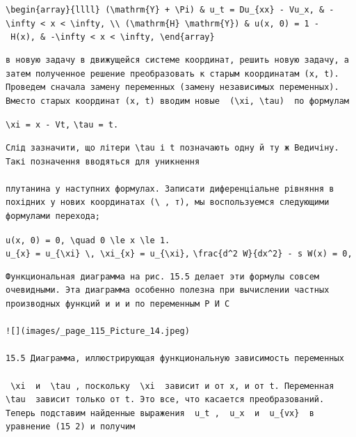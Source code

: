 \documentclass[
  ukrainian,
]{article}
\begin{document}
\texttt{\textbackslash{}begin\{array\}\{llll\}\ (\textbackslash{}mathrm\{Y\}\ +\ \textbackslash{}Pi)\ \&\ u\_t\ =\ Du\_\{xx\}\ -\ Vu\_x,\ \&\ -\textbackslash{}infty\ \textless{}\ x\ \textless{}\ \textbackslash{}infty,\ \textbackslash{}\textbackslash{}\ (\textbackslash{}mathrm\{H\}\ \textbackslash{}mathrm\{Y\})\ \&\ u(x,\ 0)\ =\ 1\ -\ H(x),\ \&\ -\textbackslash{}infty\ \textless{}\ x\ \textless{}\ \textbackslash{}infty,\ \textbackslash{}end\{array\}}

\begin{verbatim}
в новую задачу в движущейся системе координат, решить новую задачу, а затем полученное решение преобразовать к старым координатам (x, t). Проведем сначала замену переменных (замену независимых переменных). Вместо старых координат (x, t) вводим новые  (\xi, \tau)  по формулам
\end{verbatim}

\texttt{\textbackslash{}xi\ =\ x\ -\ Vt,}
\texttt{\textbackslash{}tau\ =\ t.}

\begin{verbatim}
Слід зазначити, що літери \tau і t позначають одну й ту ж Ведичіну. Такі позначення вводяться для уникнення

плутанина у наступних формулах. Записати диференціальне рівняння в похідних у нових координатах (\ , т), мы воспользуемся следующими формулами перехода;
\end{verbatim}

\texttt{u(x,\ 0)\ =\ 0,\ \textbackslash{}quad\ 0\ \textbackslash{}le\ x\ \textbackslash{}le\ 1.}
\texttt{u\_\{x\}\ =\ u\_\{\textbackslash{}xi\}\ \textbackslash{},\ \textbackslash{}xi\_\{x\}\ =\ u\_\{\textbackslash{}xi\},}
\texttt{\textbackslash{}frac\{d\^{}2\ W\}\{dx\^{}2\}\ -\ s\ W(x)\ =\ 0,}

\begin{verbatim}
Функциональная диаграмма на рис. 15.5 делает эти формулы совсем очевидными. Эта диаграмма особенно полезна при вычислении частных производных функций и и и по переменным Р И С

![](images/_page_115_Picture_14.jpeg)

15.5 Диаграмма, иллюстрирующая функциональную зависимость переменных

 \xi  и  \tau , поскольку  \xi  зависит и от x, и от t. Переменная  \tau  зависит только от t. Это все, что касается преобразований. Теперь подставим найденные выражения  u_t ,  u_x  и  u_{vx}  в уравнение (15 2) и получим
\end{verbatim}
\end{document}

